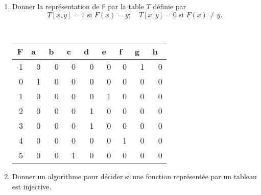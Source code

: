 \begin{enumerate}[1)]

\item{} Donner la repr\'esentation de {\tt F} par la table $T$  d\'efinie par 
\[ T[x,y] = 1 \text{   si   } F(x) = y ;\quad T[x,y] = 0 \text{   si   }F(x)\neq y .\]



\begin{framed}


\begin{center}
{\large\tt
\begin{tabular}{|r|r|r|r|r|r|r|r|r|} \hline
F&a~&b~&c~&d~&e~&f~&g~&h~\\  \hline
-1 & 0& 0& 0& 0& 0& 0& 1&0  \\  \hline
0 & 1& 0& 0& 0& 0& 0& 0&0  \\  \hline
1 & 0& 0& 0& 0& 1 & 0& 0&0 \\  \hline
2 & 0& 0& 0& 1& 0 & 0& 0&0 \\  \hline
3 & 0& 0& 0& 1& 0& 0& 0&0  \\  \hline
4 & 0& 0& 0& 0& 0 & 1& 0&0 \\  \hline
5 & 0& 0& 1& 0& 0 & 0& 0&0 \\  \hline
\end{tabular}
}

\end{center}

\end{framed}



\vspace{.4cm}
\item{} Donner un algorithme pour d\'ecider si une fonction repr\'esent\'ee par un tableau est injective.
\begin{framed}



\end{framed}
\end{enumerate}
